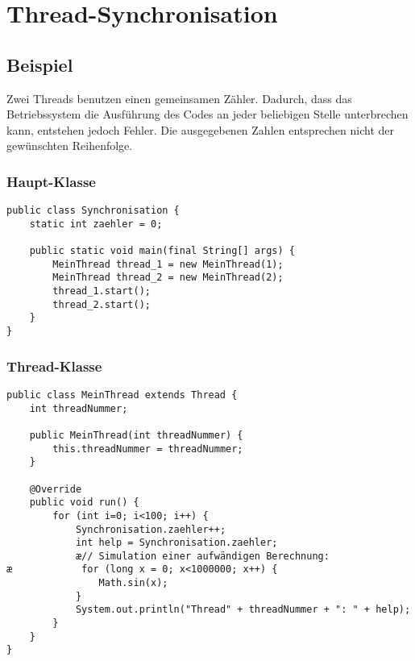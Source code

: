 \clearpage

\rehead[]{\textcolor{lightblue}{AvHG, Inf, My}}
\lohead[]{\textcolor{lightblue}{AvHG, Inf, My}}

\lstset{style=myJava}

\section{Thread-Synchronisation}

\subsection{Beispiel}

Zwei Threads benutzen einen gemeinsamen Zähler. Dadurch, dass das Betriebssystem
die Ausführung des Codes an jeder beliebigen Stelle unterbrechen kann,
entstehen jedoch Fehler. Die ausgegebenen Zahlen entsprechen nicht der
gewünschten Reihenfolge.

\subsubsection{Haupt-Klasse}

\begin{lstlisting}
public class Synchronisation {
    static int zaehler = 0;
    
    public static void main(final String[] args) {
        MeinThread thread_1 = new MeinThread(1);
        MeinThread thread_2 = new MeinThread(2);
        thread_1.start();
        thread_2.start();
    }
}
\end{lstlisting}

\subsubsection{Thread-Klasse}

\begin{lstlisting}
public class MeinThread extends Thread {
    int threadNummer;

    public MeinThread(int threadNummer) {
        this.threadNummer = threadNummer;
    }

    @Override
    public void run() {
        for (int i=0; i<100; i++) {
            Synchronisation.zaehler++;
            int help = Synchronisation.zaehler;
            æ// Simulation einer aufwändigen Berechnung:
æ            for (long x = 0; x<1000000; x++) {
                Math.sin(x);
            }
            System.out.println("Thread" + threadNummer + ": " + help);
        }
    }
}
\end{lstlisting}

